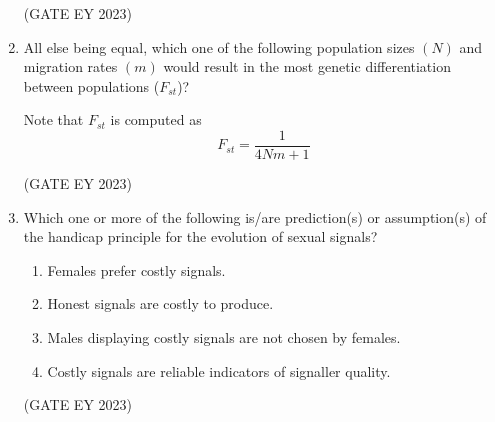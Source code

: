 \documentclass[journal,12pt,onecolumn]{IEEEtran}
\theoremstyle{remark}
\begin{document}
\begin{enumerate}
\begin{enumerate}
\end{enumerate}
\hfill{(GATE EY 2023)}



 \item
 All else being equal, which one of the following population sizes $(N)$ and 
migration rates $(m)$ would result in the most genetic differentiation between 
populations ($F_{st}$)?

Note that $F_{st}$ is computed as
\[
F_{st} = \frac{1}{4Nm + 1}
\]

\begin{enumerate}
\end{enumerate}
\hfill{(GATE EY 2023)}




 \item Which one or more of the following is/are prediction(s) or assumption(s) of the
handicap principle for the evolution of sexual signals?
\begin{enumerate}

\item Females prefer costly signals.
\item Honest signals are costly to produce.
\item Males displaying costly signals are not chosen by females.
\item Costly signals are reliable indicators of signaller quality.


\end{enumerate}

\hfill{(GATE EY 2023)}




\end{enumerate}
\end{document}
